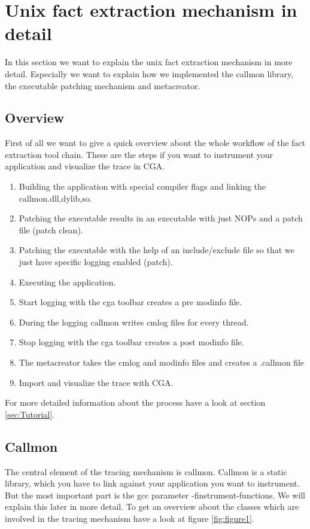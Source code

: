 \section{Unix fact extraction mechanism in detail}

In this section we want to explain the unix fact extraction mechanism in more detail. Especially we want to explain how we implemented the callmon library, the executable patching mechanism and metacreator.

\subsection{Overview}

First of all we want to give a quick overview about the whole workflow of the fact extraction tool chain. These are the steps if you want to instrument your application and visualize the trace in CGA.

\begin{enumerate}
	\item Building the application with special compiler flags and linking the callmon.{dll,dylib,so}.
	\item Patching the executable results in an executable with just NOPs and a patch file (patch clean).
	\item Patching the executable with the help of an include/exclude file so that we just have specific logging enabled (patch).
	\item Executing the application.
	\item Start logging with the cga toolbar creates a pre modinfo file.
	\item During the logging callmon writes cmlog files for every thread.
	\item Stop logging with the cga toolbar creates a post modinfo file.
	\item The metacreator takes the cmlog and modinfo files and creates a .callmon file
	\item Import and visualize the trace with CGA.
\end{enumerate}

For more detailed information about the process have a look at section \ref{sec:Tutorial}.

\subsection{Callmon}

The central element of the tracing mechanism is callmon. Callmon is a static library, which you have to link against your application you want to instrument. But the most important part is the gcc parameter -finstrument-functions. We will explain this later in more detail. To get an overview about the classes which are involved in the tracing mechanism have a look at figure \ref{fig:figure1}.\\

